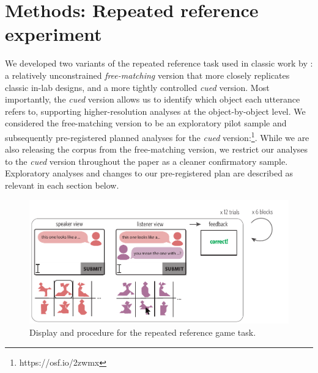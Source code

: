\documentclass[alpha-refs]{wiley-article}
\begin{document}




\section{Methods: Repeated reference experiment}

We developed two variants of the repeated reference task used in classic work by \cite{ClarkWilkesGibbs86_ReferringCollaborative}: a relatively unconstrained \emph{free-matching} version that more closely replicates classic in-lab designs, and a more tightly controlled \emph{cued} version.
Most importantly, the \emph{cued} version allows us to identify which object each utterance refers to, supporting higher-resolution analyses at the object-by-object level.
We considered the free-matching version to be an exploratory pilot sample and subsequently pre-registered planned analyses for the \emph{cued} version:\footnote{https://osf.io/2zwmx}.
While we are also releasing the corpus from the free-matching version, we restrict our analyses to the \emph{cued} version throughout the paper as a cleaner confirmatory sample.
Exploratory analyses and changes to our pre-registered plan are described as relevant in each section below.

\begin{figure}
\centering
\vspace{-1em}
\includegraphics[scale=.87]{designAndExample.pdf}
\caption{Display and procedure for the repeated reference game task.}
\label{fig:design}
\end{figure}
\end{document}
